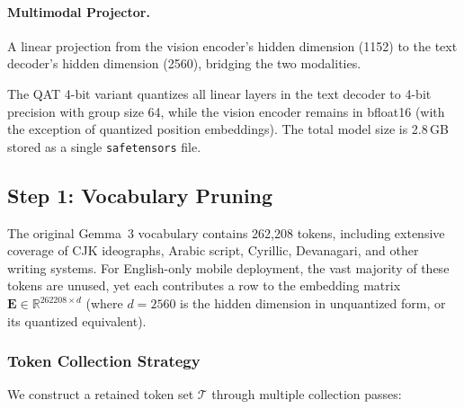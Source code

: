 \documentclass[11pt]{article}
\newcommand{\RR}{\mathbb{R}}
\begin{document}
\paragraph{Multimodal Projector.} A linear projection from the vision encoder's hidden dimension (1152) to the text decoder's hidden dimension (2560), bridging the two modalities.

The QAT 4-bit variant quantizes all linear layers in the text decoder to 4-bit precision with group size 64, while the vision encoder remains in bfloat16 (with the exception of quantized position embeddings). The total model size is 2.8\,GB stored as a single \texttt{safetensors} file.

\subsection{Step 1: Vocabulary Pruning}
\label{sec:vocab}

The original Gemma~3 vocabulary contains 262,208 tokens, including extensive coverage of CJK ideographs, Arabic script, Cyrillic, Devanagari, and other writing systems. For English-only mobile deployment, the vast majority of these tokens are unused, yet each contributes a row to the embedding matrix $\mathbf{E} \in \RR^{262208 \times d}$ (where $d = 2560$ is the hidden dimension in unquantized form, or its quantized equivalent).

\subsubsection{Token Collection Strategy}

We construct a retained token set $\mathcal{T}$ through multiple collection passes:
\end{document}
